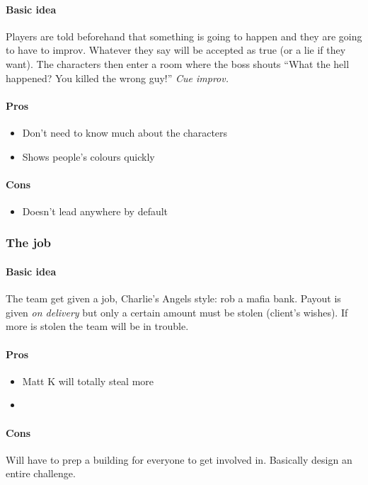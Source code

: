 \documentclass[a4paper,twocolumn,oneside]{memoir}
\begin{document}
\paragraph{Basic idea}

Players are told beforehand that something is going to happen and they are going
to have to improv. Whatever they say will be accepted as true (or a lie if they
want). The characters then enter a room where the boss shouts ``What the hell
happened? You killed the wrong guy!'' \emph{Cue improv.}

\paragraph{Pros}

\begin{itemize}
\item Don't need to know much about the characters
\item Shows people's colours quickly
\end{itemize}

\paragraph{Cons}

\begin{itemize}
\item Doesn't lead anywhere by default
\end{itemize}


\subsubsection{The job}
\label{sec:job}

\paragraph{Basic idea}

The team get given a job, Charlie's Angels style: rob a mafia bank. Payout is
given \emph{on delivery} but only a certain amount must be stolen (client's
wishes). If more is stolen the team will be in trouble.

\paragraph{Pros}

\begin{itemize}
\item Matt K will totally steal more
\item 
\end{itemize}

\paragraph{Cons}

Will have to prep a building for everyone to get involved in. Basically design
an entire challenge.
\end{document}
